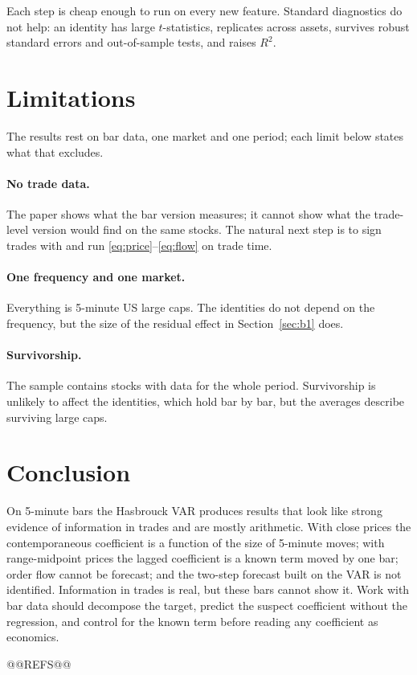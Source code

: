 \documentclass[11pt,a4paper]{article}
\begin{document}
Each step is cheap enough to run on every new feature. Standard diagnostics do not help: an identity has large $t$-statistics, replicates across
assets, survives robust standard errors and out-of-sample tests, and raises $R^2$.

\section{Limitations}
\label{sec:limits}

The results rest on bar data, one market and one period; each limit below states what that excludes.


\paragraph{No trade data.} The paper shows what the bar version measures; it cannot show what the
trade-level version would find on the same stocks. The natural next step is to sign trades with
\citet{lee1991} and run \eqref{eq:price}--\eqref{eq:flow} on trade time.

\paragraph{One frequency and one market.} Everything is 5-minute US large caps. The identities do not
depend on the frequency, but the size of the residual effect in Section~\ref{sec:b1} does.

\paragraph{Survivorship.} The sample contains stocks with data for the whole period. Survivorship is unlikely to affect the identities, which hold bar by bar, but the averages describe surviving large caps.

\section{Conclusion}

On 5-minute bars the Hasbrouck VAR produces results that look like strong evidence of information in
trades and are mostly arithmetic. With close prices the contemporaneous coefficient is a function of the
size of 5-minute moves; with range-midpoint prices the lagged coefficient is a known term moved by one
bar; order flow cannot be forecast; and the two-step forecast built on the VAR is not identified.
Information in trades is real, but these bars cannot show it. Work with bar data should decompose the
target, predict the suspect coefficient without the regression, and control for the known term before
reading any coefficient as economics.

@@REFS@@
\end{document}
